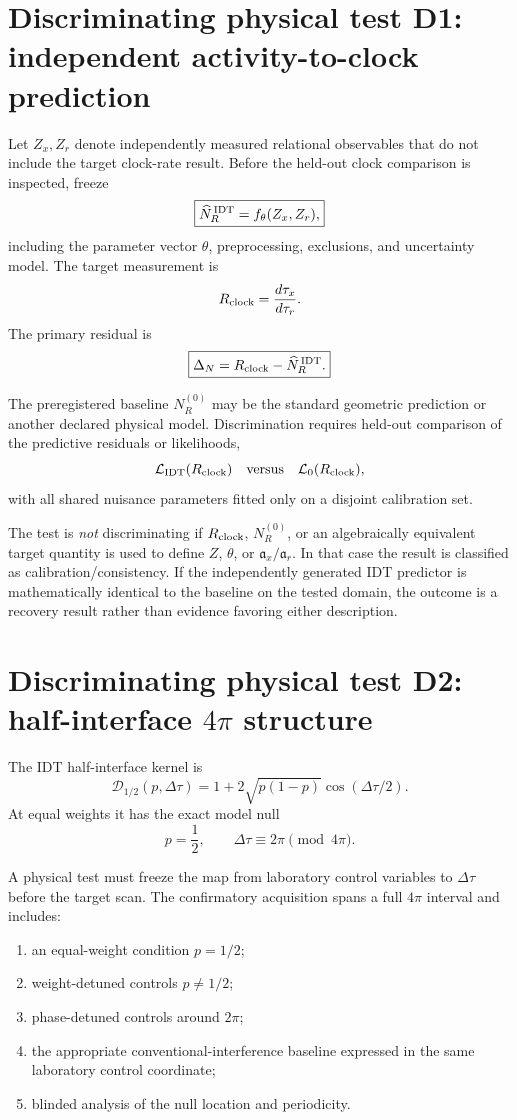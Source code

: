 \section{Discriminating physical test D1: independent activity-to-clock prediction}

Let \(Z_x,Z_r\) denote independently measured relational observables that do not include the target clock-rate result. Before the held-out clock comparison is inspected, freeze
\[
\boxed{
\widehat N_R^{\,\rm IDT}
=
f_{\theta}(Z_x,Z_r),
}
\]
including the parameter vector \(\theta\), preprocessing, exclusions, and uncertainty model. The target measurement is
\[
R_{\rm clock}
=
\frac{d\tau_x}{d\tau_r}.
\]
The primary residual is
\[
\boxed{
\Delta_N
=
R_{\rm clock}
-
\widehat N_R^{\,\rm IDT}.
}
\]

The preregistered baseline \(N_R^{(0)}\) may be the standard geometric prediction or another declared physical model. Discrimination requires held-out comparison of the predictive residuals or likelihoods,
\[
\mathcal L_{\rm IDT}(R_{\rm clock})
\quad\text{versus}\quad
\mathcal L_{0}(R_{\rm clock}),
\]
with all shared nuisance parameters fitted only on a disjoint calibration set.

The test is \emph{not} discriminating if \(R_{\rm clock}\), \(N_R^{(0)}\), or an algebraically equivalent target quantity is used to define \(Z\), \(\theta\), or \(\mathfrak a_x/\mathfrak a_r\). In that case the result is classified as calibration/consistency. If the independently generated IDT predictor is mathematically identical to the baseline on the tested domain, the outcome is a recovery result rather than evidence favoring either description.

\section{Discriminating physical test D2: half-interface \(4\pi\) structure}

The IDT half-interface kernel is
\[
\boxed{
\mathcal D_{1/2}(p,\Delta\tau)
=
1+2\sqrt{p(1-p)}\cos(\Delta\tau/2).
}
\]
At equal weights it has the exact model null
\[
p=\frac12,
\qquad
\Delta\tau\equiv2\pi\pmod{4\pi}.
\]

A physical test must freeze the map from laboratory control variables to \(\Delta\tau\) before the target scan. The confirmatory acquisition spans a full \(4\pi\) interval and includes:
\begin{enumerate}
\item an equal-weight condition \(p=1/2\);
\item weight-detuned controls \(p\neq1/2\);
\item phase-detuned controls around \(2\pi\);
\item the appropriate conventional-interference baseline expressed in the same laboratory control coordinate;
\item blinded analysis of the null location and periodicity.
\end{enumerate}

